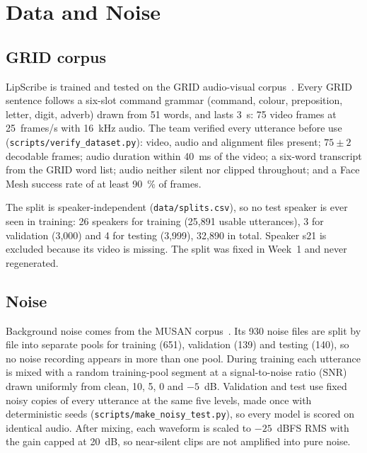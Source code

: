 \section{Data and Noise}
\label{sec:data}

\subsection{GRID corpus}
LipScribe is trained and tested on the GRID audio-visual corpus~\cite{cooke2006}. Every GRID
sentence follows a six-slot command grammar (command, colour, preposition, letter, digit,
adverb) drawn from 51 words, and lasts 3~s: 75 video frames at 25~frames/s with 16~kHz audio.
The team verified every utterance before use (\texttt{scripts/\allowbreak{}verify\_\allowbreak{}dataset.py}): video,
audio and alignment files present; $75 \pm 2$ decodable frames; audio duration within 40~ms of
the video; a six-word transcript from the GRID word list; audio neither silent nor clipped
throughout; and a Face Mesh success rate of at least 90~\% of frames.

The split is speaker-independent (\texttt{data/\allowbreak{}splits.csv}), so no test speaker is ever seen in
training: 26 speakers for training (25,891 usable utterances), 3 for validation (3,000) and 4
for testing (3,999), 32,890 in total. Speaker s21 is excluded because its video is missing.
The split was fixed in Week~1 and never regenerated.

\subsection{Noise}
Background noise comes from the MUSAN corpus~\cite{snyder2015}. Its 930 noise files are split
by file into separate pools for training (651), validation (139) and testing (140), so no noise
recording appears in more than one pool. During training each utterance is mixed with a random
training-pool segment at a signal-to-noise ratio (SNR) drawn uniformly from clean, 10, 5, 0 and
$-5$~dB. Validation and test use fixed noisy copies of every utterance at the same five levels,
made once with deterministic seeds (\texttt{scripts/\allowbreak{}make\_\allowbreak{}noisy\_\allowbreak{}test.py}), so every model is
scored on identical audio. After mixing, each waveform is scaled to $-25$~dBFS RMS with the
gain capped at 20~dB, so near-silent clips are not amplified into pure noise.

